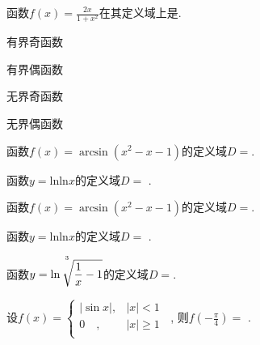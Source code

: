 		\begin{problem}
			函数$\displaystyle f\left( x \right) = \frac{2x}{1 + x^{2}}$在其定义域上是.
			
			
			\begin{abcd} \item 有界奇函数
				
				\item 有界偶函数
				
				\item 无界奇函数
				
				\item 无界偶函数
				
		\end{abcd}  \end{problem}



\begin{problem}
	函数$f\left( x \right) = \arcsin\left( x^{2} - x - 1 \right)$的定义域$D =$\fillin{$\left\lbrack - 1, 0 \right\rbrack \cup \left\lbrack 1, 2 \right\rbrack$}.
\end{problem}


\begin{problem}
	函数$y = \text{lnln}x$的定义域$D =$ .
\end{problem} 

\begin{problem}
	函数$f\left( x \right) = \arcsin\left( x^{2} - x - 1 \right)$的定义域$D =$.
\end{problem}


\begin{problem}
	函数$y = \text{lnln}x$的定义域$D =$ .
\end{problem} 


\begin{problem}
	函数$\displaystyle y = \ln\sqrt[\uproot{20}\small 3]{\frac{1}{x} - 1}$的定义域$D =$.
\end{problem} 

\begin{problem}
	设$f\left( x \right) = \left\{ \begin{matrix}
	\left| \sin x \right|, & \left| x \right| < 1 \\
	0\quad, & \left| x \right| \geq 1 \\
	\end{matrix} \right.\ $
	, 则$\displaystyle f\left( - \frac{\pi}{4} \right) =$ .
\end{problem} 


